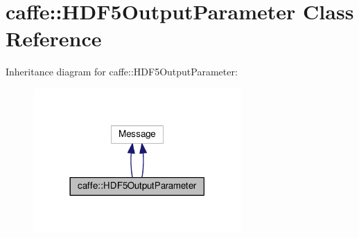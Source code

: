 \hypertarget{classcaffe_1_1_h_d_f5_output_parameter}{}\section{caffe\+:\+:H\+D\+F5\+Output\+Parameter Class Reference}
\label{classcaffe_1_1_h_d_f5_output_parameter}


Inheritance diagram for caffe\+:\+:H\+D\+F5\+Output\+Parameter\+:
\nopagebreak
\begin{figure}[H]
\begin{center}
\leavevmode
\includegraphics[width=225pt]{classcaffe_1_1_h_d_f5_output_parameter__inherit__graph}
\end{center}
\end{figure}
